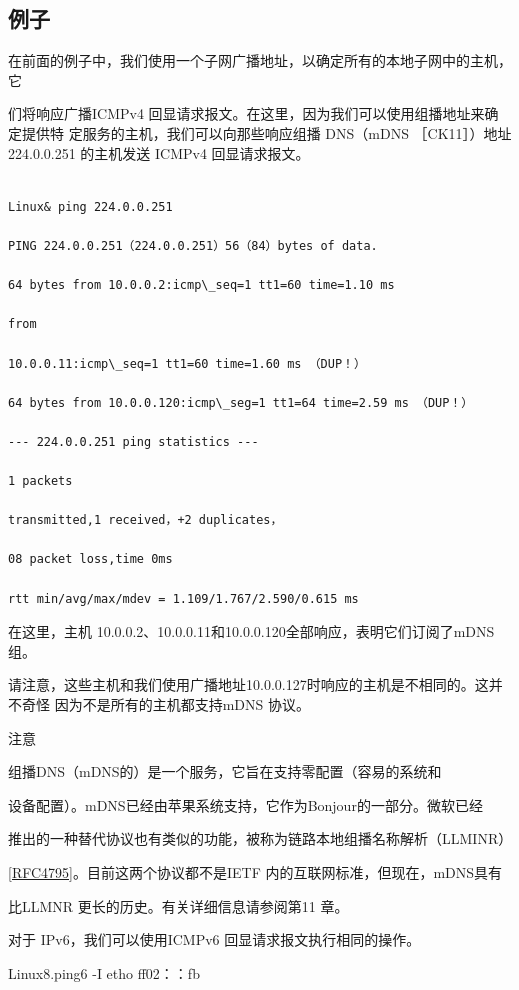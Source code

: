 \subsection{例子}
在前面的例子中，我们使用一个子网广播地址，以确定所有的本地子网中的主机，它

们将响应广播ICMPv4 回显请求报文。在这里，因为我们可以使用组播地址来确定提供特
定服务的主机，我们可以向那些响应组播 DNS（mDNS ［CK11］）地址224.0.0.251 的主机发送
ICMPv4 回显请求报文。

\begin{verbatim}
    
Linux& ping 224.0.0.251

PING 224.0.0.251（224.0.0.251）56（84）bytes of data.

64 bytes from 10.0.0.2:icmp\_seq=1 tt1=60 time=1.10 ms

from

10.0.0.11:icmp\_seq=1 tt1=60 time=1.60 ms （DUP！）

64 bytes from 10.0.0.120:icmp\_seg=1 tt1=64 time=2.59 ms （DUP！）

--- 224.0.0.251 ping statistics ---

1 packets

transmitted,1 received，+2 duplicates，

08 packet loss,time 0ms

rtt min/avg/max/mdev = 1.109/1.767/2.590/0.615 ms
\end{verbatim}

在这里，主机 10.0.0.2、10.0.0.11和10.0.0.120全部响应，表明它们订阅了mDNS组。

请注意，这些主机和我们使用广播地址10.0.0.127时响应的主机是不相同的。这并不奇怪
因为不是所有的主机都支持mDNS 协议。

注意

组播DNS（mDNS的）是一个服务，它旨在支持零配置（容易的系统和

设备配置）。mDNS已经由苹果系统支持，它作为Bonjour的一部分。微软已经

推出的一种替代协议也有类似的功能，被称为链路本地组播名称解析（LLMINR）

\href{https://www.rfc-editor.org/rfc/rfc4795}{[RFC4795]}。目前这两个协议都不是IETF 内的互联网标准，但现在，mDNS具有

比LLMNR 更长的历史。有关详细信息请参阅第11 章。

对于 IPv6，我们可以使用ICMPv6 回显请求报文执行相同的操作。

Linux8.ping6 -I etho ff02：：fb

